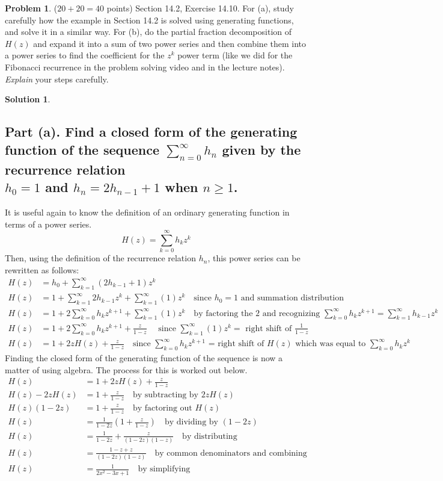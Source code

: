 \documentclass{article}
\theoremstyle{definition}
\newtheorem{problem}{Problem}
\newtheorem*{solution}{Solution}
\begin{document}
\newpage
\begin{problem} ($20+20=40$ points) Section 14.2, Exercise 14.10. 
For (a), study carefully how the example in Section 14.2 is solved using generating functions, 
and solve it in a similar way. 
For (b), do the partial fraction decomposition of $H(z)$ and expand it into a sum of two power 
series and then combine them into a power series to find the coefficient for the $z^k$ power 
term (like we did for the Fibonacci recurrence in the problem solving video and in the lecture 
notes). 
\textit{Explain} your steps carefully.
\end{problem}
\begin{solution}
\hspace{1cm}
\subsection*{Part (a). Find a closed form of the generating function of the sequence $\sum_{n=0}^{\infty} h_n$ given by the recurrence relation\\
$h_0 = 1$ and $h_n = 2h_{n-1} + 1$ when $n \geqslant 1$.}
It is useful again to know the definition of an ordinary generating function in terms of a power series.
$$ H(z) = \sum_{k=0}^{\infty} h_k z^k$$
Then, using the definition of the recurrence relation $h_n$, this power series can be rewritten as follows:
\begin{align*}
H(z) &= h_0 + \sum_{k=1}^{\infty} (2h_{k-1} + 1)z^k\\
H(z) &= 1 + \sum_{k=1}^{\infty} 2h_{k-1} z^k + \sum_{k=1}^{\infty} (1)z^k \quad \mbox{since $h_0 = 1$ and summation distribution}\\
H(z) &= 1 + 2 \sum_{k=0}^{\infty} h_k z^{k+1} + \sum_{k=1}^{\infty} (1)z^k \quad \mbox{by factoring the 2 and recognizing $\sum_{k=0}^{\infty} h_k z^{k+1} = \sum_{k=1}^{\infty}h_{k-1} z^k$ }\\
H(z) &= 1 + 2 \sum_{k=0}^{\infty} h_k z^{k+1} + \frac{z}{1-z} \quad \mbox{ since $\sum_{k=1}^{\infty} (1)z^k =$ right shift of $\frac{1}{1-z}$}\\
H(z) &= 1 + 2zH(z) + \frac{z}{1-z} \quad \mbox{since $\sum_{k=0}^{\infty} h_k z^{k+1}$ = right shift of $H(z)$ which was equal to $\sum_{k=0}^{\infty} h_k z^k$}
\end{align*}
Finding the closed form of the generating function of the sequence is now a matter of using algebra. The process for this is worked out below.
\begin{align*}
H(z) &= 1 + 2zH(z) + \frac{z}{1-z}\\
H(z) - 2zH(z) &= 1 + \frac{z}{1-z} \quad \mbox{by subtracting by $2zH(z)$}\\
H(z)(1-2z) &= 1 + \frac{z}{1-z} \quad \mbox{by factoring out $H(z)$}\\
H(z) &= \frac{1}{1-2z}(1 + \frac{z}{1-z}) \quad \mbox{by dividing by $(1-2z)$}\\
H(z) &= \frac{1}{1-2z} + \frac{z}{(1-2z)(1-z)} \quad \mbox{by distributing}\\
H(z) &= \frac{1-z+z}{(1-2z)(1-z)}\quad \mbox{by common denominators and combining}\\
H(z) &= \frac{1}{2x^2-3x+1} \quad \mbox{by simplifying}
\end{align*}

\end{solution}
\end{document}
